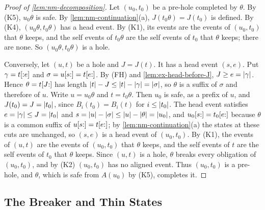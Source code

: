 \begin{proof}[Proof of \cref{lem:nm-decomposition}]
Let $(u_0,t_0)$ be a pre-hole completed by $\theta$. By (K5), $u_0\theta$ is
safe. By \cref{lem:nm-continuation}(a), $J(t_0\theta)=J(t_0)$ is defined. By
(K4), $(u_0\theta,t_0\theta)$ has a head event. By (K1), its events are the
events of $(u_0,t_0)$ that $\theta$ keeps, and the self events of $t_0\theta$
are the self events of $t_0$ that $\theta$ keeps; there are none. So
$(u_0\theta,t_0\theta)$ is a hole.

Conversely, let $(u,t)$ be a hole and $J=J(t)$. It has a head event $(s,e)$.
Put $\gamma=t[{:}e]$ and $\sigma=u[s{:}]=t[e{:}]$. By (FH) and
\cref{lem:ex-head-before-J}, $J\ge e=\lvert \gamma\rvert$. Hence
$\theta=t[J{:}]$ has length $\lvert t\rvert-J\le\lvert t\rvert-\lvert \gamma\rvert=\lvert \sigma\rvert$, so
$\theta$ is a suffix of $\sigma$ and therefore of $u$. Write $u=u_0\theta$ and
$t=t_0\theta$. Then $u_0$ is safe, as a prefix of $u$, and
$J(t_0)=J=\lvert t_0\rvert$, since $B_i(t_0)=B_i(t)$ for $i\le\lvert t_0\rvert$. The head
event satisfies $e=\lvert \gamma\rvert\le J=\lvert t_0\rvert$ and
$s=\lvert u\rvert-\lvert \sigma\rvert\le\lvert u\rvert-\lvert \theta\rvert=\lvert u_0\rvert$, and
$u_0[s{:}]=t_0[e{:}]$ because $\theta$ is a common suffix of
$u[s{:}]=t[e{:}]$; by \cref{lem:nm-continuation}(a) the states at these cuts
are unchanged, so $(s,e)$ is a head event of $(u_0,t_0)$. By (K1), the events
of $(u,t)$ are the events of $(u_0,t_0)$ that $\theta$ keeps, and the self
events of $t$ are the self events of $t_0$ that $\theta$ keeps. Since $(u,t)$
is a hole, $\theta$ breaks every obligation of $(u_0,t_0)$, and by (K2)
$(u_0,t_0)$ has no aligned event. Thus $(u_0,t_0)$ is a pre-hole, and
$\theta$, which is safe from $A(u_0)$ by (K5), completes it.
\end{proof}

\subsection{The Breaker and Thin States}\label{app:nm-breaker}

